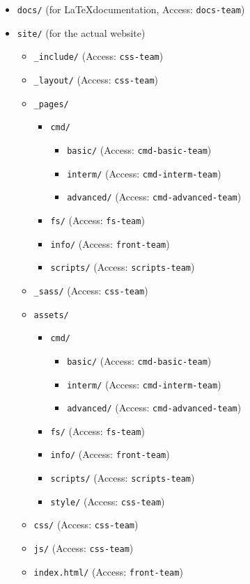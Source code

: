 \documentclass[hidelinks,12pt,a4paper,numbers=enddot]{scrartcl}
\begin{document}
\begin{itemize}
\item \texttt{docs/} (for \LaTeX documentation, Access: \texttt{docs-team})
\item \texttt{site/} (for the actual website)
	\begin{itemize}
	\item \texttt{\_include/} (Access: \texttt{css-team})
	\item \texttt{\_layout/} (Access: \texttt{css-team})
	\item \texttt{\_pages/}
		\begin{itemize}
            \item \texttt{cmd/}
			\begin{itemize}
			\item \texttt{basic/} (Access: \texttt{cmd-basic-team})
			\item \texttt{interm/} (Access: \texttt{cmd-interm-team})
			\item \texttt{advanced/} (Access: \texttt{cmd-advanced-team})
			\end{itemize}
		\item \texttt{fs/} (Access: \texttt{fs-team})
		\item \texttt{info/} (Access: \texttt{front-team})
		\item \texttt{scripts/} (Access: \texttt{scripts-team})
		\end{itemize}
	\item \texttt{\_sass/} (Access: \texttt{css-team})
	\item \texttt{assets/}
		\begin{itemize}
		\item \texttt{cmd/}
			\begin{itemize}
			\item \texttt{basic/} (Access: \texttt{cmd-basic-team})
			\item \texttt{interm/} (Access: \texttt{cmd-interm-team})
			\item \texttt{advanced/} (Access: \texttt{cmd-advanced-team})
			\end{itemize}
		\item \texttt{fs/} (Access: \texttt{fs-team})
		\item \texttt{info/} (Access: \texttt{front-team})
		\item \texttt{scripts/} (Access: \texttt{scripts-team})
		\item \texttt{style/} (Access: \texttt{css-team})
		\end{itemize}
	\item \texttt{css/} (Access: \texttt{css-team})
	\item \texttt{js/} (Access: \texttt{css-team})
	\item \texttt{index.html/} (Access: \texttt{front-team})
	\end{itemize}
\end{itemize}
\end{document}
